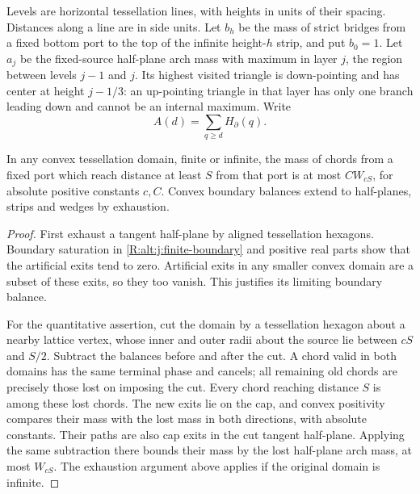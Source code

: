 Levels are horizontal tessellation lines, with heights in units of their
spacing. Distances along a line are in side units. Let $b_h$ be the mass
of strict bridges from a fixed bottom port to the top of the infinite
height-$h$ strip, and put $b_0=1$. Let $a_j$ be the fixed-source
half-plane arch mass with maximum in layer $j$, the region between levels
$j-1$ and $j$. Its highest visited triangle is down-pointing and has
center at height $j-1/3$: an up-pointing triangle in that layer has only
one branch leading down and cannot be an internal maximum.
Write
\[
 A(d)=\sum_{q\ge d}H_\partial(q).
\]

\begin{lemma}\label{R:signed:cap}
In any convex tessellation domain, finite or infinite, the mass of chords
from a fixed port which reach distance at least $S$ from that port is at
most $C W_{cS}$, for absolute positive constants $c,C$. Convex boundary
balances extend to half-planes, strips and wedges by exhaustion.
\end{lemma}
\begin{proof}
First exhaust a tangent half-plane by aligned tessellation hexagons.
Boundary saturation in \eqref{R:alt:j:finite-boundary} and positive real
parts show that the artificial exits tend to zero. Artificial exits in
any smaller convex domain are a subset of these exits, so they too vanish.
This justifies its limiting boundary balance.

For the quantitative assertion, cut the domain by a tessellation hexagon
about a nearby lattice vertex, whose inner and outer radii about the source
lie between $cS$ and $S/2$. Subtract the balances before and after the cut.
A chord valid in both domains has the same terminal phase and cancels;
all remaining old chords are precisely those lost on imposing the cut.
Every chord reaching distance $S$ is among these lost chords. The new
exits lie on the cap, and convex positivity compares their mass with the
lost mass in both directions, with absolute constants. Their paths are
also cap exits in the cut tangent half-plane. Applying the same subtraction
there bounds their mass by the lost half-plane arch mass, at most
$W_{cS}$. The exhaustion argument above applies if the original domain
is infinite.
\end{proof}

